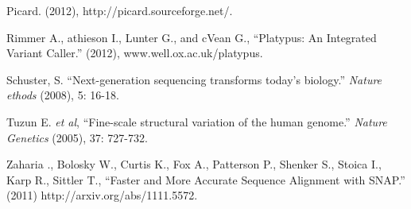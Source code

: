 \documentclass[10pt]{article}
\begin{document}
\begin{thebibliography}{1}
 Picard. (2012), http://picard.sourceforge.net/.

 Rimmer A., athieson I., Lunter G., and cVean G., ``Platypus: An Integrated Variant Caller.'' (2012), www.well.ox.ac.uk/platypus.

 Schuster, S. ``Next-generation sequencing transforms today's biology.'' {\em Nature ethods} (2008), 5: 16-18.

 Tuzun E. {\em et al}, ``Fine-scale structural variation of the human genome.'' {\em Nature Genetics} (2005), 37: 727-732. 

 Zaharia ., Bolosky W., Curtis K., Fox A., Patterson P., Shenker S., Stoica I., Karp R., Sittler T., ``Faster and More Accurate Sequence Alignment with SNAP.'' (2011) http://arxiv.org/abs/1111.5572.

\end{thebibliography}
\end{document}

